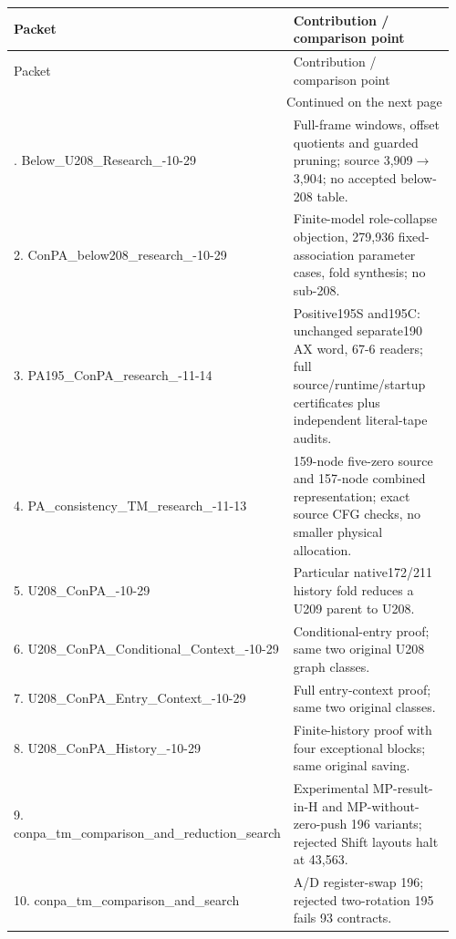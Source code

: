 \footnotesize\setlength{\tabcolsep}{4pt}
\begin{longtable}{@{}p{0.34\linewidth}p{0.62\linewidth}@{}}
\toprule Packet & Contribution / comparison point\\\midrule\endfirsthead
\toprule Packet & Contribution / comparison point\\\midrule\endhead
\midrule\multicolumn{2}{r}{Continued on the next page}\\\endfoot
\bottomrule\endlastfoot
1. Below\_\allowbreak U208\_\allowbreak Research\_\allowbreak 2026-10-29 & Full-frame windows, offset quotients and guarded pruning; source 3,909$\to$3,904; no accepted below-208 table.\\[5pt]
2. ConPA\_\allowbreak below208\_\allowbreak research\_\allowbreak 2026-10-29 & Finite-model role-collapse objection, 279,936 fixed-association parameter cases, fold synthesis; no sub-208.\\[5pt]
3. PA195\_\allowbreak ConPA\_\allowbreak research\_\allowbreak 2026-11-14 & Positive195S and195C: unchanged separate190 AX word, 67-6 readers; full source/runtime/startup certificates plus independent literal-tape audits.\\[5pt]
4. PA\_\allowbreak consistency\_\allowbreak TM\_\allowbreak research\_\allowbreak 2026-11-13 & 159-node five-zero source and 157-node combined representation; exact source CFG checks, no smaller physical allocation.\\[5pt]
5. U208\_\allowbreak ConPA\_\allowbreak 2026-10-29 & Particular native172/211 history fold reduces a U209 parent to U208.\\[5pt]
6. U208\_\allowbreak ConPA\_\allowbreak Conditional\_\allowbreak Context\_\allowbreak 2026-10-29 & Conditional-entry proof; same two original U208 graph classes.\\[5pt]
7. U208\_\allowbreak ConPA\_\allowbreak Entry\_\allowbreak Context\_\allowbreak 2026-10-29 & Full entry-context proof; same two original classes.\\[5pt]
8. U208\_\allowbreak ConPA\_\allowbreak History\_\allowbreak 2026-10-29 & Finite-history proof with four exceptional blocks; same original saving.\\[5pt]
9. conpa\_\allowbreak tm\_\allowbreak comparison\_\allowbreak and\_\allowbreak reduction\_\allowbreak search & Experimental MP-result-in-H and MP-without-zero-push 196 variants; rejected Shift layouts halt at 43,563.\\[5pt]
10. conpa\_\allowbreak tm\_\allowbreak comparison\_\allowbreak and\_\allowbreak search & A/D register-swap 196; rejected two-rotation 195 fails 93 contracts.\\[5pt]

\end{longtable}
